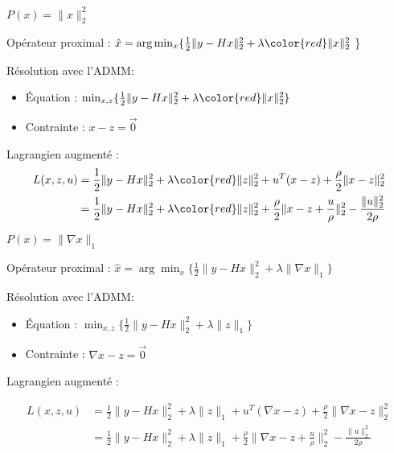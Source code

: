 \begin{frame}{$P(x) = \lVert x \rVert_{2}^{2}$}

Opérateur proximal : $\hat{x} = \arg \min_{x} \{ 
    \frac{1}{2} \lVert y - Hx \rVert_{2}^{2} 
    + \lambda {\color{red} \lVert x \rVert_{2}^{2}}$ 
\} \\

\vspace{5mm}

Résolution avec l'ADMM:
\begin{itemize}
    \item Équation : $\min_{x, z} \{ 
        \frac{1}{2} \lVert y - Hx \rVert_{2}^{2} 
        + \lambda {\color{red} \lVert x \rVert_{2}^{2}} \}$
    \item Contrainte : $x-z = \overrightarrow{0}$
\end{itemize}

\vspace{5mm}

Lagrangien augmenté :
\begin{align*}
L(x, z, u)
&= \frac{1}{2} \lVert y - Hx \rVert_{2}^{2} 
+ \lambda {\color{red} \lVert z \rVert_{2}^{2}} +
u^{T}(x-z) + \frac{\rho}{2} \lVert x-z \rVert_{2}^{2} \\
&= \frac{1}{2} \lVert y - Hx \rVert_{2}^{2} 
+ \lambda {\color{red} \lVert z \rVert_{2}^{2}} +
\frac{\rho}{2} \lVert x-z+\frac{u}{\rho} \rVert_{2}^{2} - \frac{\lVert u \rVert_{2}^{2}}{2\rho}
\end{align*}

\end{frame}

\begin{frame}{$P(x) = \lVert \nabla x \rVert_{1}$}

Opérateur proximal : $\hat{x} = \arg \min_{x} \{ \frac{1}{2} \lVert y - Hx \rVert_{2}^{2} + \lambda \lVert \nabla x \rVert_{1} \}$ \\

\vspace{5mm}

Résolution avec l'ADMM:
\begin{itemize}
    \item Équation : $\min_{x, z} \{ \frac{1}{2} \lVert y - Hx \rVert_{2}^{2} + \lambda \lVert z \rVert_{1} \}$
    \item Contrainte : $\nabla x - z = \overrightarrow{0}$
\end{itemize}

\vspace{5mm}

Lagrangien augmenté :

\begin{align*}
L(x, z, u) 
&= \frac{1}{2} \lVert y - Hx \rVert_{2}^{2} + \lambda \lVert z \rVert_{1} +
u^{T}(\nabla x-z) + \frac{\rho}{2} \lVert \nabla x-z \rVert_{2}^{2} \\
&= \frac{1}{2} \lVert y - Hx \rVert_{2}^{2} + \lambda \lVert z \rVert_{1} +
\frac{\rho}{2} \lVert \nabla x-z+\frac{u}{\rho} \rVert_{2}^{2} - \frac{\lVert u \rVert_{2}^{2}}{2\rho}    
\end{align*}

\end{frame}

